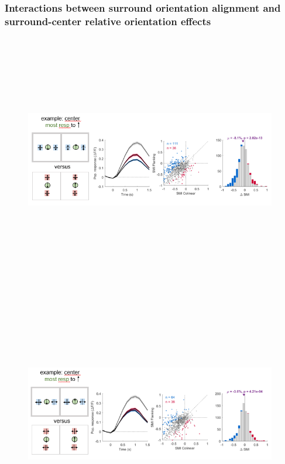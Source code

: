 \subsubsection{Interactions between surround orientation alignment and surround-center relative orientation effects}

\begin{figure}[H] \centering \includegraphics[width=11cm,height=11cm,keepaspectratio]{Figures/7.Results/finalPopulation/sel/diagrams/11.png} 
\end{figure}

\begin{figure}[H] \centering \includegraphics[width=11cm,height=11cm,keepaspectratio]{Figures/7.Results/finalPopulation/sel/diagrams/12.png} 
\end{figure}

